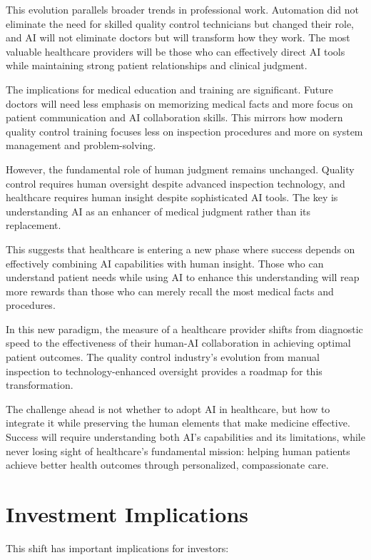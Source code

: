 \documentclass[
  Letterpaper,
]{scrbook}
\begin{document}
This evolution parallels broader trends in professional work. Automation
did not eliminate the need for skilled quality control technicians but
changed their role, and AI will not eliminate doctors but will transform
how they work. The most valuable healthcare providers will be those who
can effectively direct AI tools while maintaining strong patient
relationships and clinical judgment.

The implications for medical education and training are significant.
Future doctors will need less emphasis on memorizing medical facts and
more focus on patient communication and AI collaboration skills. This
mirrors how modern quality control training focuses less on inspection
procedures and more on system management and problem-solving.

However, the fundamental role of human judgment remains unchanged.
Quality control requires human oversight despite advanced inspection
technology, and healthcare requires human insight despite sophisticated
AI tools. The key is understanding AI as an enhancer of medical judgment
rather than its replacement.

This suggests that healthcare is entering a new phase where success
depends on effectively combining AI capabilities with human insight.
Those who can understand patient needs while using AI to enhance this
understanding will reap more rewards than those who can merely recall
the most medical facts and procedures.

In this new paradigm, the measure of a healthcare provider shifts from
diagnostic speed to the effectiveness of their human-AI collaboration in
achieving optimal patient outcomes. The quality control industry's
evolution from manual inspection to technology-enhanced oversight
provides a roadmap for this transformation.

The challenge ahead is not whether to adopt AI in healthcare, but how to
integrate it while preserving the human elements that make medicine
effective. Success will require understanding both AI's capabilities and
its limitations, while never losing sight of healthcare's fundamental
mission: helping human patients achieve better health outcomes through
personalized, compassionate care.

\section{Investment Implications}\label{investment-implications}

This shift has important implications for investors:
\end{document}
